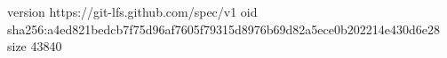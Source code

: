 version https://git-lfs.github.com/spec/v1
oid sha256:a4ed821bedcb7f75d96af7605f79315d8976b69d82a5ece0b202214e430d6e28
size 43840
